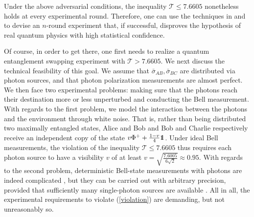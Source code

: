 \documentclass[onecolumn,prx,amsmath,amssymb,12pt]{revtex4-2}
\begin{document}
\begin{appendix}
Under the above adversarial conditions, the inequality $\mathscr{T}\leq 7.6605$ nonetheless holds at every experimental round. Therefore, one can use the techniques in \cite{Elkouss} and \cite{Mateus} to devise an $n$-round experiment that, if successful, disproves the hypothesis of real quantum physics with high statistical confidence.

Of course, in order to get there, one first needs to realize a quantum entanglement swapping experiment with $\mathscr{T}>7.6605$. We next discuss the technical feasibility of this goal. We assume that $\bar{\sigma}_{AB},\bar{\sigma}_{BC}$ are distributed via photon sources, and that photon polarization measurements are almost perfect. We then face two experimental problems: making sure that the photons reach their destination more or less unperturbed and conducting the Bell measurement. With regards to the first problem, we model the interaction between the photons and the environment through white noise. That is, rather than being distributed two maximally entangled states, Alice and Bob and Bob and Charlie respectively receive an independent copy of the state $v\Phi^++\frac{1-v}{4}\openone$. Under ideal Bell measurements, the violation of the inequality $\mathscr{T}\leq 7.6605$ thus requires each photon source to have a visibility $v$ of at least $v=\sqrt{\frac{7.6005}{6\sqrt{2}}}\approx 0.95$. With regards to the second problem, deterministic Bell-state measurements with photons are indeed complicated \cite{Bell_meas_impossible}, but they can be carried out with arbitrary precision, provided that sufficiently many single-photon sources are available \cite{Bell_meas_possible}. All in all, the experimental requirements to violate (\ref{violation}) are demanding, but not unreasonably so.


\end{appendix}
\end{document}
